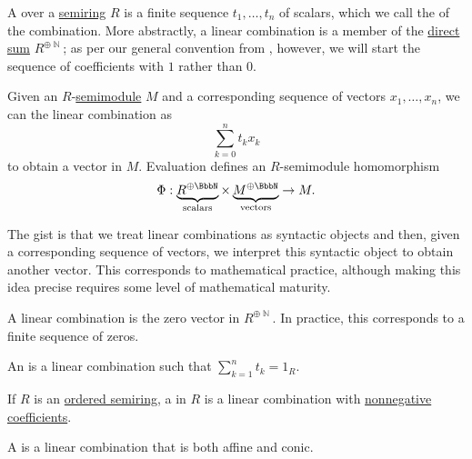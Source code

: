 \begin{definition}\label{def:linear_combination}\mimprovised
  A  over a \hyperref[def:semiring]{semiring} \( R \) is a finite sequence \( t_1, \ldots, t_n \) of scalars, which we call the  of the combination. More abstractly, a linear combination is a member of the \hyperref[def:semimodule_direct_product]{direct sum} \( R^{\oplus \BbbN} \); as per our general convention from , however, we will start the sequence of coefficients with \( 1 \) rather than \( 0 \).

  Given an \( R \)-\hyperref[def:semimodule]{semimodule} \( M \) and a corresponding sequence of vectors \( x_1, \ldots, x_n \), we can  the linear combination as
  \begin{equation}
    \sum_{k=0}^n t_k x_k
  \end{equation}
  to obtain a vector in \( M \). Evaluation defines an \( R \)-semimodule homomorphism
  \begin{equation*}
    \Phi: \underbrace{R^{\oplus \BbbN}}_{\T{scalars}} \times \underbrace{M^{\oplus \BbbN}}_{\T{vectors}} \to M.
  \end{equation*}

  The gist is that we treat linear combinations as syntactic objects and then, given a corresponding sequence of vectors, we interpret this syntactic object to obtain another vector. This corresponds to mathematical practice, although making this idea precise requires some level of mathematical maturity.

  \begin{thmenum}
     A  linear combination is the zero vector in \( R^{\oplus \BbbN} \). In practice, this corresponds to a finite sequence of zeros.

     An  is a linear combination such that \( \sum_{k=1}^n t_k = 1_R \).

     If \( R \) is an \hyperref[def:ordered_semiring]{ordered semiring}, a  in \( R \) is a linear combination with \hyperref[def:ordered_semiring]{nonnegative coefficients}.

     A  is a linear combination that is both affine and conic.
  \end{thmenum}
\end{definition}


